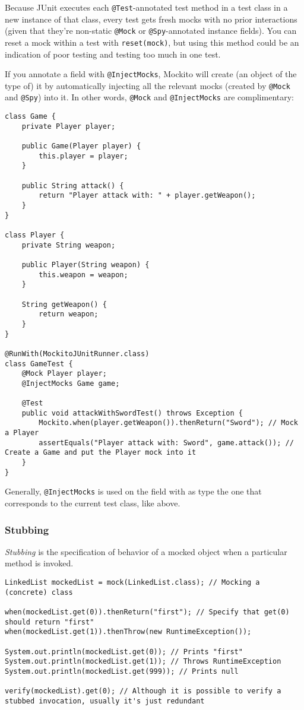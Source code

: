 \documentclass[8pt, table, xcdraw]{article}%
\begin{document}
Because JUnit executes each \lstinline{@Test}-annotated test method in a test class in a new instance of that class, every test gets fresh mocks with no prior interactions (given that they're non-static \lstinline{@Mock} or \lstinline{@Spy}-annotated instance fields). You can reset a mock within a test with \lstinline{reset(mock)}, but using this method could be an indication of poor testing and testing too much in one test.

If you annotate a field with \lstinline{@InjectMocks}, Mockito will create (an object of the type of) it by automatically injecting all the relevant mocks (created by \lstinline{@Mock} and \lstinline{@Spy}) into it. In other words, \lstinline{@Mock} and \lstinline{@InjectMocks} are complimentary:

\begin{lstlisting}
class Game {
    private Player player;

    public Game(Player player) {
        this.player = player;
    }

    public String attack() {
        return "Player attack with: " + player.getWeapon();
    }
}

class Player {
    private String weapon;

    public Player(String weapon) {
        this.weapon = weapon;
    }

    String getWeapon() {
        return weapon;
    }
}

@RunWith(MockitoJUnitRunner.class)
class GameTest {
    @Mock Player player;
    @InjectMocks Game game; 

    @Test
    public void attackWithSwordTest() throws Exception {
        Mockito.when(player.getWeapon()).thenReturn("Sword"); // Mock a Player
        assertEquals("Player attack with: Sword", game.attack()); // Create a Game and put the Player mock into it
    }
}
\end{lstlisting}

Generally, \lstinline{@InjectMocks} is used on the field with as type the one that corresponds to the current test class, like above.

\subsubsection{Stubbing}

\emph{Stubbing} is the specification of behavior of a mocked object when a particular method is invoked.

\begin{lstlisting}
LinkedList mockedList = mock(LinkedList.class); // Mocking a (concrete) class

when(mockedList.get(0)).thenReturn("first"); // Specify that get(0) should return "first"
when(mockedList.get(1)).thenThrow(new RuntimeException());

System.out.println(mockedList.get(0)); // Prints "first"
System.out.println(mockedList.get(1)); // Throws RuntimeException
System.out.println(mockedList.get(999)); // Prints null

verify(mockedList).get(0); // Although it is possible to verify a stubbed invocation, usually it's just redundant
\end{lstlisting}
\end{document}
